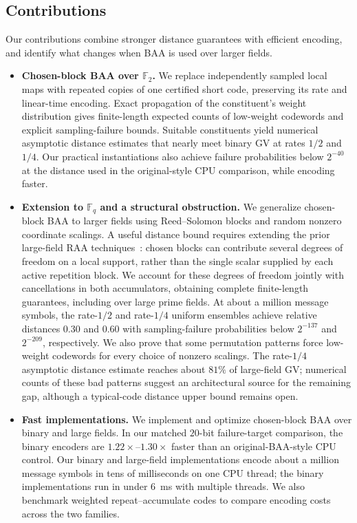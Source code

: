 \documentclass[runningheads,envcountsame,envcountsect]{llncs}
\newcommand{\F}{\mathbb F}
\begin{document}
\subsection{Contributions}
\label{sec:contributions}

Our contributions combine stronger distance guarantees with efficient encoding,
and identify what changes when BAA is used over larger fields.

\begin{itemize}
    \item \textbf{Chosen-block BAA over $\F_2$.}
    We replace independently sampled local maps with repeated copies of one
    certified short code, preserving its rate and linear-time encoding.
    Exact propagation of the constituent's weight distribution gives
    finite-length expected counts of low-weight codewords and explicit
    sampling-failure bounds.  Suitable constituents yield numerical
    asymptotic distance estimates that nearly meet binary GV at rates
    $1/2$ and $1/4$.  Our practical instantiations also achieve failure
    probabilities below $2^{-40}$ at the distance used in the original-style
    CPU comparison, while encoding faster.

    \item \textbf{Extension to $\F_q$ and a structural obstruction.}
    We generalize chosen-block BAA to larger fields using Reed--Solomon
    blocks and random nonzero coordinate scalings.  A useful distance bound
    requires extending the prior large-field RAA
    techniques~\cite{akhiani26,khabbazian26}: chosen blocks can contribute
    several degrees of freedom on a local support, rather than the single
    scalar supplied by each active repetition block.  We account for these
    degrees of freedom jointly with cancellations in both accumulators,
    obtaining complete finite-length guarantees, including over large prime
    fields.  At about a million message symbols, the rate-$1/2$ and
    rate-$1/4$ uniform ensembles achieve relative distances $0.30$ and $0.60$
    with sampling-failure probabilities below $2^{-137}$ and $2^{-209}$,
    respectively.  We also prove that some permutation patterns force low-weight
    codewords for every choice of nonzero scalings.  The rate-$1/4$
    asymptotic distance estimate reaches about $81\%$ of large-field GV;
    numerical counts of these bad patterns suggest an architectural source
    for the remaining gap, although a typical-code distance upper bound
    remains open.

    \item \textbf{Fast implementations.}
    We implement and optimize chosen-block BAA over binary and large fields.
    In our matched $20$-bit failure-target comparison, the binary encoders
    are $1.22\times$--$1.30\times$ faster than an original-BAA-style CPU
    control.  Our binary and large-field implementations encode about a
    million message symbols in tens of milliseconds on one CPU thread;
    the binary implementations run in under $6$~ms with multiple threads.
    We also benchmark weighted repeat--accumulate codes to compare encoding
    costs across the two families.


\end{itemize}
\end{document}
